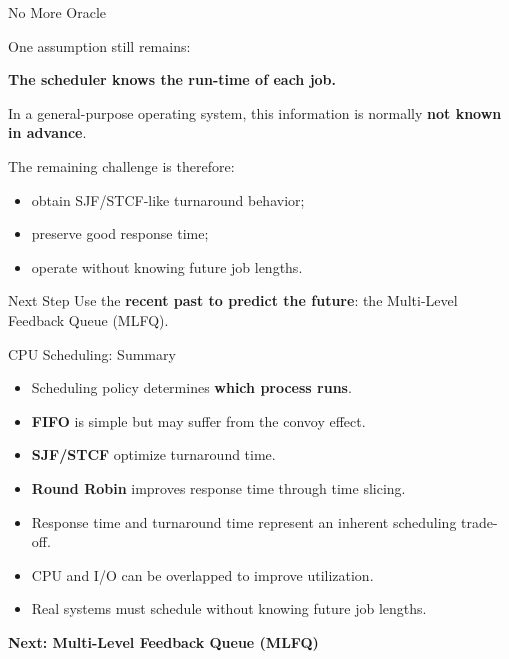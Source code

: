 \begin{frame}{No More Oracle}

One assumption still remains:

\begin{center}
\textbf{The scheduler knows the run-time of each job.}
\end{center}

In a general-purpose operating system, this information is normally
\textbf{not known in advance}.

\medskip

The remaining challenge is therefore:

\begin{itemize}
    \item obtain SJF/STCF-like turnaround behavior;
    \item preserve good response time;
    \item operate without knowing future job lengths.
\end{itemize}

\begin{block}{Next Step}
Use the \textbf{recent past to predict the future}:
the Multi-Level Feedback Queue (MLFQ).
\end{block}

\end{frame}

\begin{frame}{CPU Scheduling: Summary}

\begin{itemize}
    \item Scheduling policy determines \textbf{which process runs}.
    \item \textbf{FIFO} is simple but may suffer from the convoy effect.
    \item \textbf{SJF/STCF} optimize turnaround time.
    \item \textbf{Round Robin} improves response time through time slicing.
    \item Response time and turnaround time represent an inherent
          scheduling trade-off.
    \item CPU and I/O can be overlapped to improve utilization.
    \item Real systems must schedule without knowing future job lengths.
\end{itemize}

\medskip

\begin{center}
\textbf{Next: Multi-Level Feedback Queue (MLFQ)}
\end{center}

\end{frame}